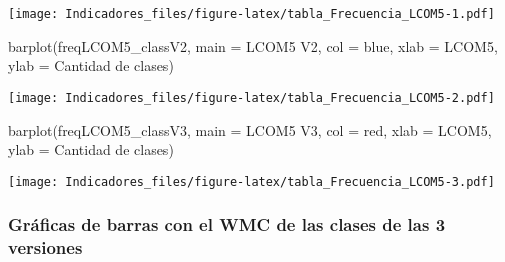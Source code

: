 \documentclass[
]{article}
\newenvironment{Shaded}{\begin{snugshade}}{\end{snugshade}}
\newcommand{\AttributeTok}[1]{\textcolor[rgb]{0.77,0.63,0.00}{#1}}
\newcommand{\FunctionTok}[1]{\textcolor[rgb]{0.00,0.00,0.00}{#1}}
\newcommand{\NormalTok}[1]{#1}
\newcommand{\StringTok}[1]{\textcolor[rgb]{0.31,0.60,0.02}{#1}}
\begin{document}
\texttt{[image: Indicadores\_files/figure-latex/tabla\_Frecuencia\_LCOM5-1.pdf]}

\begin{Shaded}
\begin{Highlighting}[]
\FunctionTok{barplot}\NormalTok{(freqLCOM5\_classV2,}
        \AttributeTok{main =} \StringTok{\textquotesingle{}LCOM5 V2\textquotesingle{}}\NormalTok{,}
        \AttributeTok{col =} \StringTok{\textquotesingle{}blue\textquotesingle{}}\NormalTok{,}
        \AttributeTok{xlab =} \StringTok{\textquotesingle{}LCOM5\textquotesingle{}}\NormalTok{,}
        \AttributeTok{ylab =} \StringTok{\textquotesingle{}Cantidad de clases\textquotesingle{}}\NormalTok{)}
\end{Highlighting}
\end{Shaded}

\texttt{[image: Indicadores\_files/figure-latex/tabla\_Frecuencia\_LCOM5-2.pdf]}

\begin{Shaded}
\begin{Highlighting}[]
\FunctionTok{barplot}\NormalTok{(freqLCOM5\_classV3,}
        \AttributeTok{main =} \StringTok{\textquotesingle{}LCOM5 V3\textquotesingle{}}\NormalTok{,}
        \AttributeTok{col =} \StringTok{\textquotesingle{}red\textquotesingle{}}\NormalTok{,}
        \AttributeTok{xlab =} \StringTok{\textquotesingle{}LCOM5\textquotesingle{}}\NormalTok{,}
        \AttributeTok{ylab =} \StringTok{\textquotesingle{}Cantidad de clases\textquotesingle{}}\NormalTok{)}
\end{Highlighting}
\end{Shaded}

\texttt{[image: Indicadores\_files/figure-latex/tabla\_Frecuencia\_LCOM5-3.pdf]}

\hypertarget{gruxe1ficas-de-barras-con-el-wmc-de-las-clases-de-las-3-versiones}{%
\subsubsection{Gráficas de barras con el WMC de las clases de las 3
versiones}\label{gruxe1ficas-de-barras-con-el-wmc-de-las-clases-de-las-3-versiones}}
\end{document}
